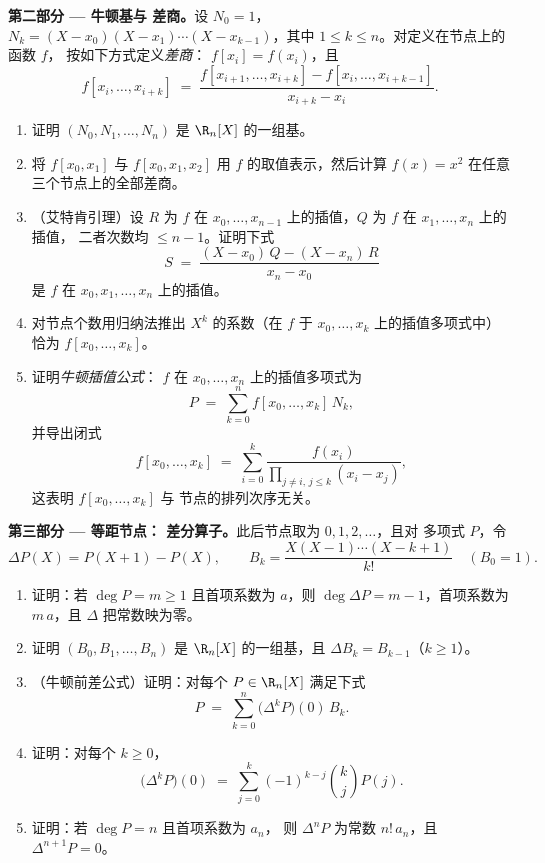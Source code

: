 \begin{problem}
\medskip
\noindent\textbf{第二部分 --- 牛顿基与
差商。}设 $N_0 = 1$，$N_k = (X - x_0)(X - x_1) \cdots
(X - x_{k-1})$，其中 $1 \leq k \leq n$。对定义在节点上的函数 $f$，
按如下方式定义\emph{差商}：
$f[x_i] = f(x_i)$，且
\[
f[x_i, \dots, x_{i+k}] \;=\;
\frac{f[x_{i+1}, \dots, x_{i+k}] - f[x_i, \dots, x_{i+k-1}]}
{x_{i+k} - x_i} .
\]
\begin{enumerate}[resume]
  \item 证明 $(N_0, N_1, \dots, N_n)$ 是
        $\R_n[X]$ 的一组基。
  \item 将 $f[x_0, x_1]$ 与 $f[x_0, x_1, x_2]$ 用
        $f$ 的取值表示，然后计算
        $f(x) = x^2$ 在任意三个节点上的全部差商。
  \item （艾特肯引理）设 $R$ 为 $f$ 在 $x_0, \dots,
        x_{n-1}$ 上的插值，$Q$ 为 $f$ 在 $x_1, \dots, x_n$ 上的插值，
        二者次数均 $\leq n - 1$。证明下式
        \[
        S \;=\; \frac{(X - x_0)\,Q - (X - x_n)\,R}{x_n - x_0}
        \]
        是 $f$ 在 $x_0, x_1, \dots, x_n$ 上的插值。
  \item 对节点个数用归纳法推出
        $X^{k}$ 的系数（在 $f$ 于 $x_0,
        \dots, x_k$ 上的插值多项式中）恰为 $f[x_0, \dots, x_k]$。
  \item 证明\emph{牛顿插值公式}：
        $f$ 在 $x_0, \dots, x_n$ 上的插值多项式为
        \[
        P \;=\; \sum_{k=0}^{n} f[x_0, \dots, x_k]\, N_k ,
        \]
        并导出闭式
        \[
        f[x_0, \dots, x_k] \;=\; \sum_{i=0}^{k}
        \frac{f(x_i)}{\prod_{j \neq i,\, j \leq k} (x_i - x_j)} ,
        \]
        这表明 $f[x_0, \dots, x_k]$ 与
        节点的排列次序无关。
\end{enumerate}

\medskip
\noindent\textbf{第三部分 --- 等距节点：
差分算子。}此后节点取为 $0, 1, 2, \dots$，且对
多项式 $P$，令
\[
\Delta P(X) = P(X + 1) - P(X),
\qquad
B_k = \frac{X(X-1)\cdots(X-k+1)}{k!} \quad (B_0 = 1).
\]
\begin{enumerate}[resume]
  \item 证明：若 $\deg P = m \geq 1$ 且首项系数为
        $a$，则 $\deg \Delta P = m - 1$，首项系数为
        $m\,a$，且 $\Delta$ 把常数映为零。
  \item 证明 $(B_0, B_1, \dots, B_n)$ 是
        $\R_n[X]$ 的一组基，且 $\Delta B_k = B_{k-1}$（$k \geq 1$）。
  \item （牛顿前差公式）证明：对每个 $P
        \in \R_n[X]$ 满足下式
        \[
        P \;=\; \sum_{k=0}^{n} \bigl(\Delta^{k} P\bigr)(0)\, B_k .
        \]
  \item 证明：对每个 $k \geq 0$，
        \[
        \bigl(\Delta^{k} P\bigr)(0) \;=\;
        \sum_{j=0}^{k} (-1)^{k-j} \binom{k}{j} P(j) .
        \]
  \item 证明：若 $\deg P = n$ 且首项系数为 $a_n$，
        则 $\Delta^{n} P$ 为常数 $n!\,a_n$，且
        $\Delta^{n+1} P = 0$。
\end{enumerate}


\end{problem}
